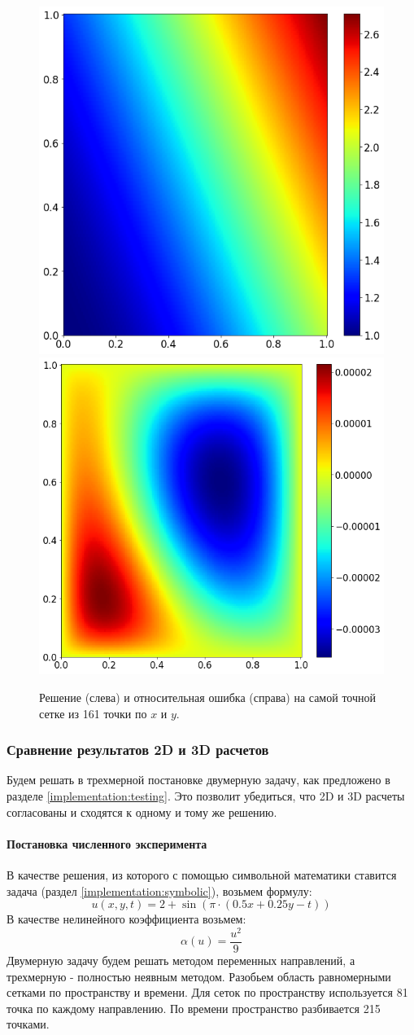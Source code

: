 \begin{figure}[H]
\centering
\includegraphics[height=.45\textwidth]{heat2d/solution.png}
\includegraphics[height=.45\textwidth]{heat2d/error.png}
\caption{Решение (слева) и относительная ошибка (справа) на самой точной сетке из 161 точки по $x$ и $y$.}
\label{fig:heat2d_field}
\end{figure}



\subsubsection*{Сравнение результатов 2D и 3D расчетов}
Будем решать в трехмерной постановке двумерную задачу, как предложено в разделе \ref{implementation:testing}. Это позволит убедиться, что 2D и 3D расчеты согласованы и сходятся к одному и тому же решению.
\paragraph{Постановка численного эксперимента}
В качестве решения, из которого с помощью символьной математики ставится задача (раздел \ref{implementation:symbolic}), возьмем формулу:
\begin{equation}
u(x, y, t) = 2 + \sin \left(\pi \cdot \left( 0.5x + 0.25y - t\right) \right)
\end{equation}
В качестве нелинейного коэффициента возьмем:
\begin{equation}
\alpha(u) = \frac{u^2}{9}
\end{equation}
Двумерную задачу будем решать методом переменных направлений, а трехмерную - полностью неявным методом. Разобьем область равномерными сетками по пространству и времени. Для сеток по пространству используется 81 точка по каждому направлению. По времени пространство разбивается 215 точками.

